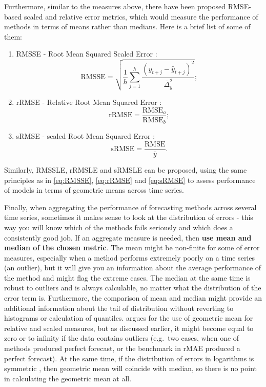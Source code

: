 \documentclass[
]{book}
\providecommand{\tightlist}{%
  \setlength{\itemsep}{0pt}\setlength{\parskip}{0pt}}
\theoremstyle{definition}
\theoremstyle{definition}
\theoremstyle{definition}
\theoremstyle{definition}
\theoremstyle{remark}
\begin{document}
Furthermore, similar to the measures above, there have been proposed RMSE-based scaled and relative error metrics, which would measure the performance of methods in terms of means rather than medians. Here is a brief list of some of them:

\begin{enumerate}
\def\labelenumi{\arabic{enumi}.}
\tightlist
\item
  RMSSE - Root Mean Squared Scaled Error \citep{Makridakis2020a}:
  \begin{equation}
   \mathrm{RMSSE} = \sqrt{\frac{1}{h} \sum_{j=1}^h \frac{(y_{t+j} - \hat{y}_{t+j})^2}{\bar{\Delta}_y^2}} ;
   \label{eq:RMSSE}
  \end{equation}
\item
  rRMSE - Relative Root Mean Squared Error \citep{Stock2004}:
  \begin{equation}
   \mathrm{rRMSE} = \frac{\mathrm{RMSE}_a}{\mathrm{RMSE}_b} ;
   \label{eq:rRMSE}
  \end{equation}
\item
  sRMSE - scaled Root Mean Squared Error \citep{Petropoulos2015}:
  \begin{equation}
   \mathrm{sRMSE} = \frac{\mathrm{RMSE}}{\bar{y}} .
   \label{eq:sRMSE}
  \end{equation}
\end{enumerate}

Similarly, RMSSLE, rRMSLE and sRMSLE can be proposed, using the same principles as in \eqref{eq:RMSSE}, \eqref{eq:rRMSE} and \eqref{eq:sRMSE} to assess performance of models in terms of geometric means across time series.

Finally, when aggregating the performance of forecasting methods across several time series, sometimes it makes sense to look at the distribution of errors - this way you will know which of the methods fails seriously and which does a consistently good job. If an aggregate measure is needed, then \textbf{use mean and median of the chosen metric}. The mean might be non-finite for some of error measures, especially when a method performs extremely poorly on a time series (an outlier), but it will give you an information about the average performance of the method and might flag the extreme cases. The median at the same time is robust to outliers and is always calculable, no matter what the distribution of the error term is. Furthermore, the comparison of mean and median might provide an additional information about the tail of distribution without reverting to histograms or calculation of quantiles. \citet{Davydenko2013} argues for the use of geometric mean for relative and scaled measures, but as discussed earlier, it might become equal to zero or to infinity if the data contains outliers (e.g.~two cases, when one of methods produced perfect forecast, or the benchmark in rMAE produced a perfect forecast). At the same time, if the distribution of errors in logarithms is symmetric \citep[which is the main argument of][]{Davydenko2013}, then geometric mean will coincide with median, so there is no point in calculating the geometric mean at all.
\end{document}
